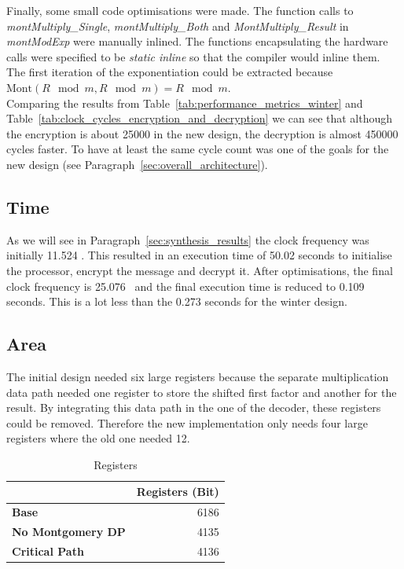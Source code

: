 \documentclass[a4paper]{article}
\begin{document}
Finally, some small code optimisations were made. The function calls to \textit{montMultiply\_Single}, \textit{montMultiply\_Both} and \textit{MontMultiply\_Result} in \textit{montModExp} were manually inlined. The functions encapsulating the hardware calls were specified to be \textit{static inline} so that the compiler would inline them. The first iteration of the exponentiation could be extracted because $\text{Mont}(R\mod{m}, R\mod{m}) = R\mod{m}$.\\

Comparing the results from Table~\ref{tab:performance_metrics_winter} and Table~\ref{tab:clock_cycles_encryption_and_decryption} we can see that although the encryption is about 25000 in the new design, the decryption is almost 450000 cycles faster. To have at least the same cycle count was one of the goals for the new design (see Paragraph~\ref{sec:overall_architecture}).

\subsection{Time}

As we will see in Paragraph~\ref{sec:synthesis_results} the clock frequency was initially 11.524 \mega\hertz. This resulted in an execution time of 50.02 seconds to initialise the processor, encrypt the message and decrypt it. After optimisations, the final clock frequency is 25.076 \mega\hertz\ and the final execution time is reduced to 0.109 seconds. This is a lot less than the 0.273 seconds for the winter design.

\subsection{Area}

The initial design needed six large registers because the separate multiplication data path needed one register to store the shifted first factor and another for the result. By integrating this data path in the one of the decoder, these registers could be removed. Therefore the new implementation only needs four large registers where the old one needed 12.\\

\begin{table}[H]
	\begin{center}	
		\begin{tabular}{l|r}
			& \textbf{Registers} (Bit)\\\hline
        		\textbf{Base} & 6186\\
             \textbf{No Montgomery DP} & 4135\\
             \textbf{Critical Path} & 4136
		\end{tabular}
	\end{center}
	\caption{Registers}
	\label{tab:registers}
\end{table}
\end{document}
